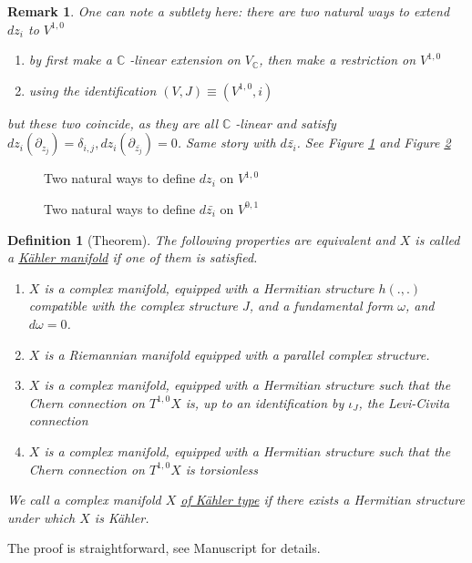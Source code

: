 \documentclass[11pt]{article}
\newtheorem{remark}{Remark}
\newtheorem{definition}{Definition}
\begin{document}
\begin{remark}
One can note a subtlety here: there are two natural ways to extend \(dz_i\) to \(V^{1,0}\)
\begin{enumerate}
\item by first make a \(\mathbb{C}\) -linear extension on \(V_{\mathbb{C}}\), then make a restriction on \(V^{1,0}\)
\item using the identification \((V,J)\equiv (V^{1,0},i)\)
\end{enumerate}
but these two coincide, as they are all \(\mathbb{C}\) -linear and satisfy \(dz_i(\partial_{z_j}) =
\delta_{i,j}, dz_i(\partial_{\bar{z_j}}) = 0\). Same story with \(d\bar{z_i}\). See Figure \ref{fig:dz}
and Figure \ref{fig:dzbar}
\end{remark}

\begin{figure}
\centering
\label{fig:dz}
\caption{Two natural ways to define $dz_i$ on $V^{1,0}$}
\end{figure}

\begin{figure}
\centering
\label{fig:dzbar}
\caption{Two natural ways to define $d\bar{z_i}$ on $V^{0,1}$}
\end{figure}

\begin{definition}[Theorem]
The following properties are equivalent and \(X\) is called a \uline{Kähler manifold} if one of them is satisfied.
\begin{enumerate}
\item \(X\) is a complex manifold, equipped with a Hermitian structure \(h(.,.)\) compatible with the complex
structure \(J\), and a fundamental form \(\omega\), and \(d\omega=0\).
\item \(X\) is a Riemannian manifold equipped with a parallel complex structure.
\item \(X\) is a complex manifold, equipped with a Hermitian structure such that the Chern connection on
\(T^{1,0}X\) is, up to an identification by \(\iota_J\), the Levi-Civita connection
\item \(X\) is a complex manifold, equipped with a Hermitian structure such that the Chern connection on
\(T^{1,0}X\) is torsionless
\end{enumerate}
We call a complex manifold \(X\) \uline{of Kähler type} if there exists a Hermitian structure under which
\(X\) is Kähler.
\end{definition}
The proof is straightforward, see Manuscript for details.
\end{document}
